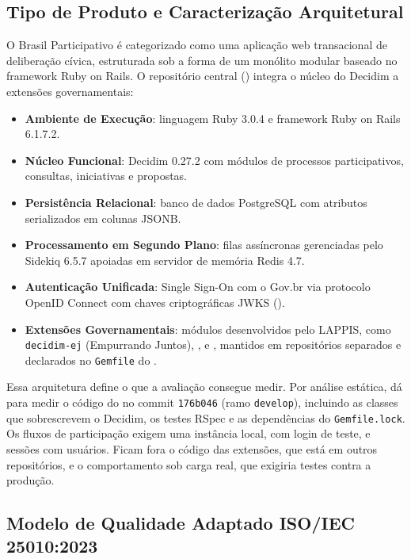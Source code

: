 \documentclass[journal]{IEEEtran}
\begin{document}
\subsection{Tipo de Produto e Caracterização Arquitetural}
\label{sec:arquitetura}

O Brasil Participativo é categorizado como uma aplicação web transacional de deliberação cívica, estruturada sob a forma de um monólito modular baseado no framework Ruby on Rails. O repositório central () integra o núcleo do Decidim a extensões governamentais:

\begin{itemize}
    \item \textbf{Ambiente de Execução}: linguagem Ruby 3.0.4 e framework Ruby on Rails 6.1.7.2.
    \item \textbf{Núcleo Funcional}: Decidim 0.27.2 com módulos de processos participativos, consultas, iniciativas e propostas.
    \item \textbf{Persistência Relacional}: banco de dados PostgreSQL com atributos serializados em colunas JSONB.
    \item \textbf{Processamento em Segundo Plano}: filas assíncronas gerenciadas pelo Sidekiq 6.5.7 apoiadas em servidor de memória Redis 4.7.
    \item \textbf{Autenticação Unificada}: Single Sign-On com o Gov.br via protocolo OpenID Connect com chaves criptográficas JWKS ().
    \item \textbf{Extensões Governamentais}: módulos desenvolvidos pelo LAPPIS, como \texttt{decidim-ej} (Empurrando Juntos), ,  e , mantidos em repositórios separados e declarados no \texttt{Gemfile} do .
\end{itemize}

Essa arquitetura define o que a avaliação consegue medir. Por análise estática, dá para medir o código do  no commit \texttt{176b046} (ramo \texttt{develop}), incluindo as classes que sobrescrevem o Decidim, os testes RSpec e as dependências do \texttt{Gemfile.lock}. Os fluxos de participação exigem uma instância local, com login de teste, e sessões com usuários. Ficam fora o código das extensões, que está em outros repositórios, e o comportamento sob carga real, que exigiria testes contra a produção.

\subsection{Modelo de Qualidade Adaptado ISO/IEC 25010:2023}
\label{sec:modelo_square}
\end{document}
